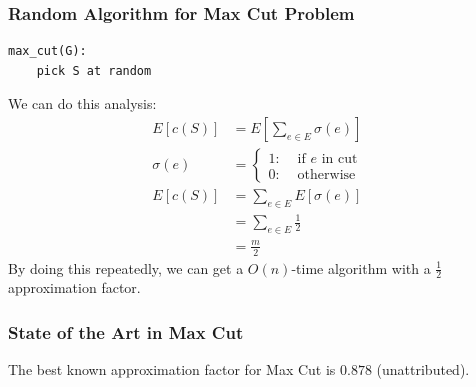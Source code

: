                 \subsubsection{Random Algorithm for Max Cut Problem} %
                \label{ssub:random_algorithm_for_max_cut_problem}
                    \begin{lstlisting}
max_cut(G):
    pick S at random
                    \end{lstlisting}
                    We can do this analysis:
                    \begin{align*}
                        E[c(S)] &= E\left[ \sum_{e \in E} \sigma(e) \right] \\
                        \sigma(e) &=
                            \left\{
                                \begin{array}{lr}
                                    1 :& \text{ if $e$ in cut }\\
                                    0 :& \text{ otherwise }
                                \end{array}
                            \right. \\
                        E[c(S)] &= \sum_{e \in E} E[\sigma(e)] \\
                        &= \sum_{e \in E} \frac{1}{2} \\
                        &= \frac{m}{2}
                    \end{align*}
                    By doing this repeatedly, we can get a $O(n)$-time algorithm with a $\frac{1}{2}$ approximation factor.
                \subsubsection{State of the Art in Max Cut} %
                \label{ssub:state_of_the_art_in_max_cut}
                    The best known approximation factor for Max Cut is $0.878$ (unattributed).
